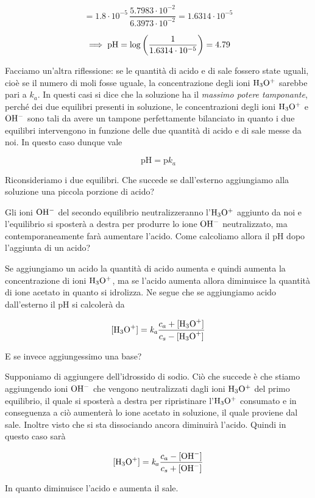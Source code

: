 $$=1.8 \cdot 10^{-5}\,\frac{5.7983\cdot 10^{-2}}{6.3973\cdot 10^{-2}}=1.6314\cdot 10^{-5}$$

$$\implies \rm pH=\log\left( \frac{1}{1.6314\cdot 10^{-5}} \right)=4.79$$

Facciamo un'altra riflessione: se le quantità di acido e di sale fossero state uguali, cioè se il numero di moli fosse uguale, la concentrazione degli ioni $\rm H_3O^+$ sarebbe pari a $k_a$. In questi casi si dice che la soluzione ha il \textit{massimo potere tamponante}, perché dei due equilibri presenti in soluzione, le concentrazioni degli ioni $\rm H_3O^+$ e $\rm OH^-$ sono tali da avere un tampone perfettamente bilanciato in quanto i due equilibri intervengono in funzione delle due quantità di acido e di sale messe da noi. In questo caso dunque vale

$$\text{pH}=\text{p}k_a$$

Riconsideriamo i due equilibri. Che succede se dall'esterno aggiungiamo alla soluzione una piccola porzione di acido?

Gli ioni $\rm OH^-$ del secondo equilibrio neutralizzeranno l'$\rm H_3O^+$ aggiunto da noi e l'equilibrio si sposterà a destra per produrre lo ione $\rm OH^-$ neutralizzato, ma contemporaneamente farà aumentare l'acido. Come calcoliamo allora il pH dopo l'aggiunta di un acido?

Se aggiungiamo un acido la quantità di acido aumenta e quindi aumenta la concentrazione di ioni $\rm H_3O^+$, ma se l'acido aumenta allora diminuisce la quantità di ione acetato in quanto si idrolizza. Ne segue che se aggiungiamo acido dall'esterno il pH si calcolerà da

$${[\text{H}_3\text{O}^+]}=\textit{k}_\textit{a} \frac{c_a + \rm{[\text{H}_3\text{O}^+]}}{c_s - \rm{[\text{H}_3\text{O}^+]}}$$

E se invece aggiungessimo una base?

Supponiamo di aggiungere dell'idrossido di sodio. Ciò che succede è che stiamo aggiungendo ioni $\rm OH^-$ che vengono neutralizzati dagli ioni $\rm H_3O^+$ del primo equilibrio, il quale si sposterà a destra per ripristinare l'$\rm H_3O^+$ consumato e in conseguenza a ciò aumenterà lo ione acetato in soluzione, il quale proviene dal sale. Inoltre visto che si sta dissociando ancora diminuirà l'acido. Quindi in questo caso sarà

$${[\text{H}_3\text{O}^+]}=\textit{k}_a \frac{c_a - {[\text{OH}^-]}}{c_s + \rm{[\text{OH}^-]}}$$

In quanto diminuisce l'acido e aumenta il sale.

